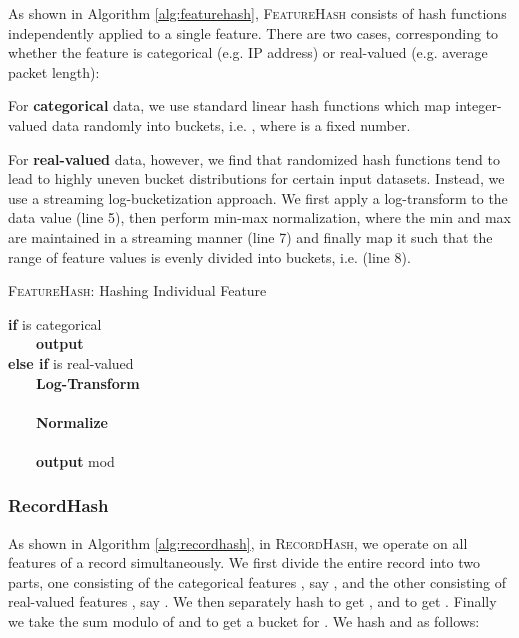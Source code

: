 \documentclass[sigconf]{acmart}
\begin{document}
As shown in Algorithm \ref{alg:featurehash}, \textsc{FeatureHash} consists of hash functions independently applied to a single feature. There are two cases, corresponding to whether the feature is categorical (e.g. IP address) or real-valued (e.g. average packet length):

For \textbf{categorical} data, we use standard linear hash functions \cite{litwin1980linear} which map integer-valued data randomly into  buckets, i.e. , where  is a fixed number.


For \textbf{real-valued} data, however, we find that randomized hash functions tend to lead to highly uneven bucket distributions for certain input datasets. Instead, we use a streaming log-bucketization approach. We first apply a log-transform to the data value (line 5), then perform min-max normalization, where the min and max are maintained in a streaming manner (line 7) and finally map it such that the range of feature values is evenly divided into  buckets, i.e.  (line 8). 
    
\begin{algorithm}
	\caption{\textsc{FeatureHash}: Hashing Individual Feature  \label{alg:featurehash}}
	\textbf{if}  is categorical  \\
	\ \ \ \ \textbf{output}   \\
	\textbf{else if}  is real-valued  \\
	\ \ \ \ {\bf  Log-Transform} \\
	\ \ \ \ \ \ \ \  \\
	\ \ \ \ {\bf  Normalize} \\
	\ \ \ \ \ \ \ \   \\
    \ \ \ \ {\bf output} mod  \\
\end{algorithm}


\subsubsection{RecordHash}
\label{sec:record}

As shown in Algorithm \ref{alg:recordhash}, in \textsc{RecordHash}, we operate on all features of a record simultaneously. We first divide the entire record  into two parts, one consisting of the categorical features , say , and the other consisting of real-valued features , say . We then separately hash  to get , and  to get . Finally we take the sum modulo  of  and  to get a bucket for . We hash  and  as follows:
\end{document}

